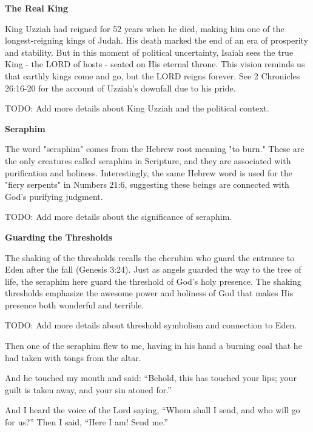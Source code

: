 \documentclass[11pt]{article}
\begin{document}
{\large\bfseries The Real King}
{\vspace{1em}}

King Uzziah had reigned for 52 years when he died, making him one of the longest-reigning kings of Judah. His death marked the end of an era of prosperity and stability. But in this moment of political uncertainty, Isaiah sees the true King - the LORD of hosts - seated on His eternal throne. This vision reminds us that earthly kings come and go, but the LORD reigns forever. See 2 Chronicles 26:16-20 for the account of Uzziah's downfall due to his pride.

{\vspace{1em}}
TODO: Add more details about King Uzziah and the political context.

{\large\bfseries Seraphim}
{\vspace{1em}}

The word "seraphim" comes from the Hebrew root meaning "to burn." These are the only creatures called seraphim in Scripture, and they are associated with purification and holiness. Interestingly, the same Hebrew word is used for the "fiery serpents" in Numbers 21:6, suggesting these beings are connected with God's purifying judgment.

{\vspace{1em}}
TODO: Add more details about the significance of seraphim.

{\large\bfseries Guarding the Thresholds}
{\vspace{1em}}

The shaking of the thresholds recalls the cherubim who guard the entrance to Eden after the fall (Genesis 3:24). Just as angels guarded the way to the tree of life, the seraphim here guard the threshold of God's holy presence. The shaking thresholds emphasize the awesome power and holiness of God that makes His presence both wonderful and terrible.

{\vspace{1em}}
TODO: Add more details about threshold symbolism and connection to Eden.

\begin{biblicaloutline}[Isaiah 6:6-8]
    

    \begin{versesection}{2em}
         Then one of the seraphim flew to me, having in his hand a burning coal that he had taken with tongs from the altar.

         And he touched my mouth and said: ``Behold, this has touched your lips; your guilt is taken away, and your sin atoned for.''
    \end{versesection}
    
    
    \begin{versesection}{2em}
         And I heard the voice of the Lord saying, ``Whom shall I send, and who will go for us?'' Then I said, ``Here I am! Send me.''
    \end{versesection}

\end{biblicaloutline}
\end{document}
